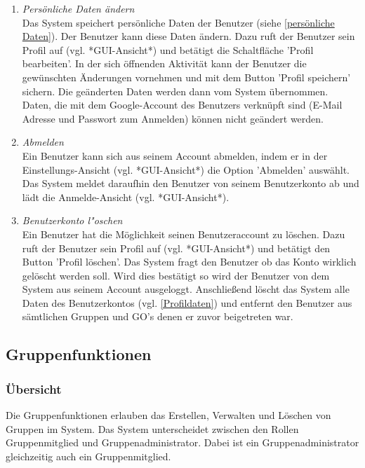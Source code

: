 \documentclass[parskip=full]{scrartcl}
\def\threedigits#1{%
  \ifnum#1<100 0\fi
  \ifnum#1<10 0\fi
  \number#1}
\begin{document}
\begin{enumerate}[label={\textbf{/F\protect\threedigits{\theenumi}0/}}, leftmargin=*]
	\item \colorbox{shadecolor}{\textit{Persönliche Daten ändern}} \\ Das System speichert persönliche Daten der Benutzer (siehe  \ref{persönliche Daten}). Der Benutzer kann diese Daten ändern. Dazu ruft der Benutzer sein Profil auf (vgl. *GUI-Ansicht*) und betätigt die Schaltfläche 'Profil bearbeiten'. In der sich öffnenden Aktivität kann der Benutzer die gewünschten Änderungen vornehmen und mit dem Button 'Profil speichern' sichern. Die geänderten Daten werden dann vom System übernommen.\\
Daten, die mit dem Google-Account des Benutzers verknüpft sind (E-Mail Adresse und Passwort zum Anmelden) können nicht geändert werden.
	
	\item \textit{Abmelden} \label{Abmelden} \\ Ein Benutzer kann sich aus seinem Account abmelden, indem er in der Einstellungs-Ansicht (vgl. *GUI-Ansicht*) die Option 'Abmelden' auswählt. Das System meldet daraufhin den Benutzer von seinem Benutzerkonto ab und lädt die Anmelde-Ansicht (vgl. *GUI-Ansicht*).
	
	\item \textit{Benutzerkonto l"oschen} \\
	Ein Benutzer hat die Möglichkeit seinen Benutzeraccount zu löschen. Dazu ruft der Benutzer sein Profil auf (vgl. *GUI-Ansicht*) und betätigt den Button 'Profil löschen'. Das System fragt den Benutzer ob das Konto wirklich gelöscht werden soll. Wird dies bestätigt so wird der Benutzer von dem System aus seinem Account ausgeloggt. Anschließend löscht das System alle Daten des Benutzerkontos (vgl. \ref{Profildaten}) und entfernt den Benutzer aus sämtlichen Gruppen und GO's denen er zuvor beigetreten war.
\end{enumerate}

\subsection{Gruppenfunktionen}

\subsubsection{Übersicht}
Die Gruppenfunktionen erlauben das Erstellen, Verwalten und Löschen von Gruppen im System. Das System unterscheidet zwischen den Rollen Gruppenmitglied und Gruppenadministrator. Dabei ist ein Gruppenadministrator gleichzeitig auch ein Gruppenmitglied.
\end{document}
